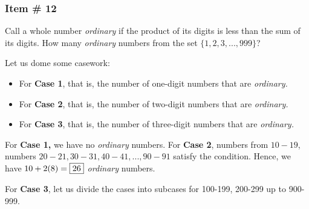 \documentclass[11pt,paper=letter]{scrartcl}
\begin{document}
\subsubsection{Item \# 12}

\begin{probboxed}
Call a whole number \textit{ordinary} if the product of its digits is less than the sum of its digits. How many \textit{ordinary} numbers from the set $\{1,2,3,...,999\}$?

\end{probboxed}



Let us dome some casework:

\begin{itemize}
    \item For \textbf{Case 1}, that is, the number of one-digit numbers that are \textit{ordinary.}
    
     \item For \textbf{Case 2}, that is, the number of two-digit numbers that are \textit{ordinary.}
     
     \item For \textbf{Case 3}, that is, the number of three-digit numbers that are \textit{ordinary.}
\end{itemize}

For \textbf{Case 1,} we have no \textit{ordinary} numbers. For \textbf{Case 2}, numbers from $10 - 19$, numbers $20-21, 30-31, 40 - 41,..., 90-91$ satisfy the condition. Hence, we have $10 + 2(8) = \fbox{26}$ \textit{ordinary} numbers. 

For \textbf{Case 3}, let us divide the cases into subcases for 100-199, 200-299 up to 900-999. 
\end{document}
